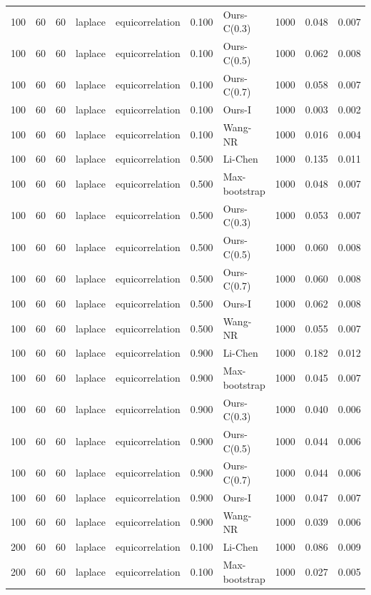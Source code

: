 \begin{tabular}{rrrllrlrrr}
100 & 60 & 60 & laplace & equicorrelation & 0.100 & Ours-C(0.3) & 1000 & 0.048 & 0.007 \\
100 & 60 & 60 & laplace & equicorrelation & 0.100 & Ours-C(0.5) & 1000 & 0.062 & 0.008 \\
100 & 60 & 60 & laplace & equicorrelation & 0.100 & Ours-C(0.7) & 1000 & 0.058 & 0.007 \\
100 & 60 & 60 & laplace & equicorrelation & 0.100 & Ours-I & 1000 & 0.003 & 0.002 \\
100 & 60 & 60 & laplace & equicorrelation & 0.100 & Wang-NR & 1000 & 0.016 & 0.004 \\
100 & 60 & 60 & laplace & equicorrelation & 0.500 & Li-Chen & 1000 & 0.135 & 0.011 \\
100 & 60 & 60 & laplace & equicorrelation & 0.500 & Max-bootstrap & 1000 & 0.048 & 0.007 \\
100 & 60 & 60 & laplace & equicorrelation & 0.500 & Ours-C(0.3) & 1000 & 0.053 & 0.007 \\
100 & 60 & 60 & laplace & equicorrelation & 0.500 & Ours-C(0.5) & 1000 & 0.060 & 0.008 \\
100 & 60 & 60 & laplace & equicorrelation & 0.500 & Ours-C(0.7) & 1000 & 0.060 & 0.008 \\
100 & 60 & 60 & laplace & equicorrelation & 0.500 & Ours-I & 1000 & 0.062 & 0.008 \\
100 & 60 & 60 & laplace & equicorrelation & 0.500 & Wang-NR & 1000 & 0.055 & 0.007 \\
100 & 60 & 60 & laplace & equicorrelation & 0.900 & Li-Chen & 1000 & 0.182 & 0.012 \\
100 & 60 & 60 & laplace & equicorrelation & 0.900 & Max-bootstrap & 1000 & 0.045 & 0.007 \\
100 & 60 & 60 & laplace & equicorrelation & 0.900 & Ours-C(0.3) & 1000 & 0.040 & 0.006 \\
100 & 60 & 60 & laplace & equicorrelation & 0.900 & Ours-C(0.5) & 1000 & 0.044 & 0.006 \\
100 & 60 & 60 & laplace & equicorrelation & 0.900 & Ours-C(0.7) & 1000 & 0.044 & 0.006 \\
100 & 60 & 60 & laplace & equicorrelation & 0.900 & Ours-I & 1000 & 0.047 & 0.007 \\
100 & 60 & 60 & laplace & equicorrelation & 0.900 & Wang-NR & 1000 & 0.039 & 0.006 \\
200 & 60 & 60 & laplace & equicorrelation & 0.100 & Li-Chen & 1000 & 0.086 & 0.009 \\
200 & 60 & 60 & laplace & equicorrelation & 0.100 & Max-bootstrap & 1000 & 0.027 & 0.005 \\

\end{tabular}
